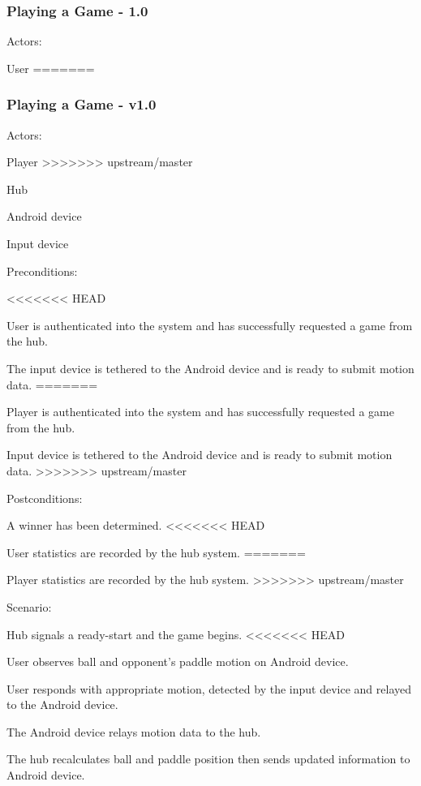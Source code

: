 \documentclass[12pt]{article}
\newenvironment{itemize*}%
  {\begin{itemize}%
  	\setlength{\parsep}{0pt}
    \setlength{\itemsep}{0pt}%
    \setlength{\parskip}{0pt}}%
  {\end{itemize}}
\newenvironment{enumerate*}%
  {\begin{enumerate}%
  	\setlength{\parsep}{0pt}
    \setlength{\itemsep}{0pt}%
    \setlength{\parskip}{0pt}}%
  {\end{enumerate}}
\begin{document}
\subsubsection{Playing a Game - 1.0}
Actors:
\begin{itemize*}
\item User
=======
\subsubsection{Playing a Game - v1.0}
Actors:
\begin{itemize*}
\item Player
>>>>>>> upstream/master
\item Hub
\item Android device
\item Input device
\end{itemize*}
Preconditions:
\begin{itemize*}
<<<<<<< HEAD
\item User is authenticated into the system and has successfully requested a game from the hub.
\item The input device is tethered to the Android device and is ready to submit motion data.
=======
\item Player is authenticated into the system and has successfully requested a game from the hub.
\item Input device is tethered to the Android device and is ready to submit motion data.
>>>>>>> upstream/master
\end{itemize*}
Postconditions:
\begin{itemize*}
\item A winner has been determined.
<<<<<<< HEAD
\item User statistics are recorded by the hub system.
=======
\item Player statistics are recorded by the hub system.
>>>>>>> upstream/master
\end{itemize*}
Scenario:
\begin{enumerate*}
\item Hub signals a ready-start and the game begins.
<<<<<<< HEAD
\item \label{UserObserves}User observes ball and opponent's paddle motion on Android device.
\item User responds with appropriate motion, detected by the input device and relayed to the Android device.
\item The Android device relays motion data to the hub.
\item \label{HubUpdateGame}The hub recalculates ball and paddle position then sends updated information to Android device.

\end{enumerate*}
\end{itemize*}
\end{document}
